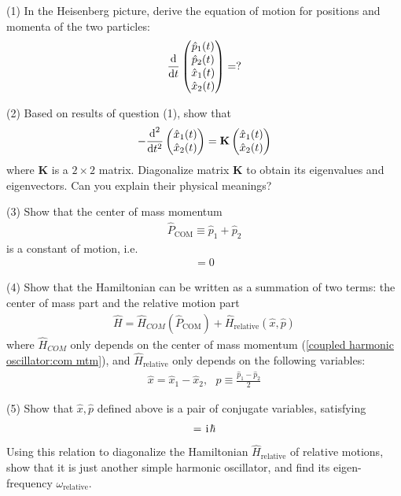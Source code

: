 (1) In the Heisenberg picture, derive the equation of motion for positions and momenta of the two particles:
\begin{align}
\frac{\text{d}}{\text{d}t}\begin{pmatrix}\hat p_1(t)\\ \hat p_2(t)\\ \hat x_1(t)\\ \hat x_2(t)\end{pmatrix}=?
\end{align}

(2) Based on results of question (1), show that 
\begin{align}
-\frac{\text{d}^2}{\text{d}t^2}\begin{pmatrix}\hat x_1(t)\\ \hat x_2(t)\end{pmatrix}=\textbf{K}\begin{pmatrix}\hat x_1(t)\\ \hat x_2(t)\end{pmatrix}
\end{align}
where $\textbf{K}$ is a $2\times2$ matrix. Diagonalize matrix $\textbf{K}$ to obtain its eigenvalues and eigenvectors. Can you explain their physical meanings? 

(3) Show that the center of mass momentum
\begin{align}\label{coupled harmonic oscillator:com mtm}
\hat P_\text{COM}\equiv \hat p_1+\hat p_2
\end{align}
is a constant of motion, i.e. 
\begin{align}
[\hat P_\text{COM},\hat H]=0
\end{align}

(4) Show that the Hamiltonian can be written as a summation of two terms: the center of mass part and the relative motion part
\begin{align}
\hat H=\hat H_{COM}(\hat P_\text{COM})+\hat H_\text{relative}(\hat x,\hat p)
\end{align}
where $\hat H_{COM}$ only depends on the center of mass momentum (\ref{coupled harmonic oscillator:com mtm}), and $\hat H_\text{relative}$ only depends on the following variables:
\begin{align}
\hat x=\hat x_1-\hat x_2,~~~\hat p\equiv\frac{\hat p_1-\hat p_2}2
\end{align}

(5) Show that $\hat x,\hat p$ defined above is a pair of conjugate variables, satisfying
\begin{align}
[\hat x,\hat p]=\imth\hbar
\end{align}
Using this relation to diagonalize the Hamiltonian $\hat H_\text{relative}$ of relative motions, show that it is just another simple harmonic oscillator, and find its eigen-frequency $\omega_\text{relative}$. 

